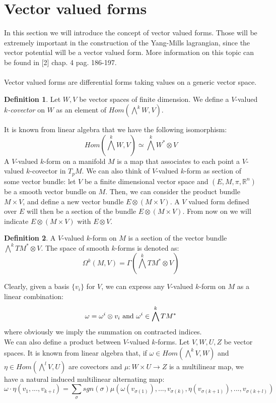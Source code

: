 \documentclass[12pt,a4paper]{report}
\theoremstyle{definition}
\newtheorem{Def}{Definition}[chapter]
\theoremstyle{Theorem}
\theoremstyle{definition}
\theoremstyle{definition}
\begin{document}
	\section{Vector valued forms}
	In this section we will introduce the concept of vector valued forms. Those will be extremely important in the construction of the Yang-Mills lagrangian, since the vector potential will be a vector valued form. More information on this topic can be found in [2] chap. 4 pag. 186-197.
	\\\\
	Vector valued forms are differential forms taking values on a generic vector space.
	\begin{Def}
		Let $W,V$ be vector spaces of finite dimension. We define a $V$-valued \textit{$k$-covector} on $W$ as an element of $Hom(\bigwedge^k W,V)$.
	\end{Def}
	It is known from linear algebra that we have the following isomorphism:
	$$Hom(\bigwedge^k W,V)\simeq \bigwedge^k W^*\otimes V$$
	A $V$-valued $k$-form on a manifold $M$ is a map that associates to each point a $V$-valued $k$-covector in $T_pM$. We can also think of $V$-valued $k$-form as section of some vector bundle: let $V$ be a finite dimensional vector space and $(E,M,\pi,\mathbb{R}^n)$ be a smooth vector bundle on $M$. Then, we can consider the product bundle $M\times V$, and define a new vector bundle $E\otimes (M\times V)$. A $V$ valued form defined over $E$ will then be a section of the bundle $E\otimes (M\times V)$. From now on we will indicate $E\otimes (M\times V)$ with $E\otimes V$.
	\begin{Def}
		A $V$-valued $k$-form on $M$ is a section of the vector bundle $\bigwedge^k TM^*\otimes V$. The space of smooth $k$-forms is denoted as:
		$$\Omega^k(M,V)=\Gamma(\bigwedge^k TM^*\otimes V)$$
	\end{Def}
	Clearly, given a basis $\{v_i\}$ for $V$, we can express any $V$-valued $k$-form on $M$ as a linear combination:
	$$\omega=\omega^i\otimes v_i \hbox{ and } \omega^i\in \bigwedge^k TM^*$$
	where obviously we imply the summation on contracted indices. \\
	We can also define a product between $V$-valued $k$-forms. Let $V,W,U,Z$ be vector spaces. It is known from linear algebra that, if $\omega\in Hom(\bigwedge^kV,W)$ and $\eta\in Hom(\bigwedge^lV,U)$ are covectors and $\mu:W\times U\rightarrow Z$ is a multilinear map, we have a natural induced multilinear alternating map:
	$$\omega\cdot \eta(v_1,...,v_{k+l})=\sum_\sigma sgn(\sigma)\mu(\omega(v_{\sigma(1)}),...,v_{\sigma(k)},\eta(v_{\sigma(k+1)}),...,v_{\sigma(k+l)})$$
\end{document}
